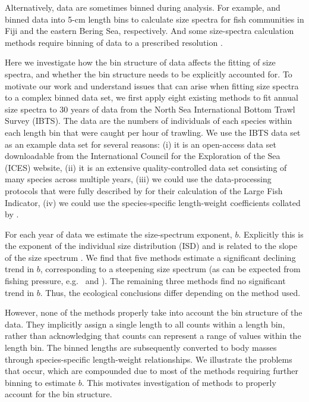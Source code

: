 \documentclass[12pt, letter]{article}
\newcommand{\MEE}{erpbb17}     %
\begin{document}
Alternatively, data are sometimes binned during analysis. For example,
\citet{dpmg04} and \citet{bblhw12} binned data into 5-cm length bins to
calculate size spectra for fish communities in Fiji and the eastern Bering Sea,
respectively. And some size-spectra calculation methods require binning of
data to a
prescribed resolution \citep{\MEE}.

Here we investigate how the bin structure of data affects the fitting of
size spectra, and whether the bin structure needs to be
explicitly accounted for.
To motivate our work and understand issues that can arise when fitting size
spectra to a complex binned data set,
we first apply eight existing methods to fit annual size spectra to 30 years of data from the
North Sea International Bottom Trawl Survey (IBTS).
The data are the numbers of individuals of each species within each length bin
that were caught per hour of trawling.
We use the IBTS data set as an example data set for several reasons: (i) it is an open-access
data set downloadable from the International Council for the Exploration of the
Sea (ICES) website, (ii) it is an extensive quality-controlled data set
consisting of many species across multiple years,
(iii) we could use the data-processing protocols that were fully
described by \citet{ffrr12} for their calculation of the Large Fish Indicator,
(iv) we could use the species-specific length-weight coefficients collated
by \citet{ffrr12}.

For each year of data we estimate the size-spectrum exponent, $b$. Explicitly
this is the exponent of the individual size distribution (ISD) and
is related to the slope of the size spectrum \citep{weke07, \MEE}. We find
that five methods estimate a significant declining trend in $b$, corresponding
to a steepening size spectrum (as can be expected from fishing pressure,
e.g.~\citealt{rg96} and \citealt{dgpr05}). The remaining three methods
find no significant trend in $b$. Thus, the ecological conclusions differ depending on the
method used.

However, none of the methods properly take into account the bin structure of the
data.
They implicitly assign a single length to all counts within
a length bin, rather than acknowledging that counts can represent a range of
values within the length bin. The binned lengths are subsequently converted to
body masses through species-specific length-weight relationships.
We illustrate the problems that occur, which are compounded due to
most of the methods requiring further binning to estimate $b$.
This motivates investigation of methods to properly account for the bin
structure.
\end{document}
